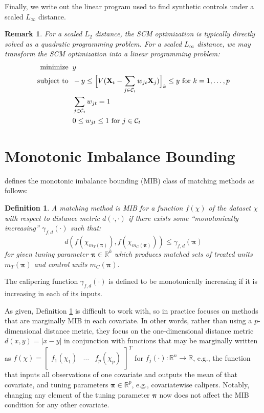 \documentclass{article}
\newtheorem{remark}{Remark}
\newtheorem{definition}{Definition}[section]
\newcommand{\Xt}{\mathbf{X}_t}
\newcommand{\Xj}{\mathbf{X}_j}
\newcommand{\R}{\mathbb{R}}
\newcommand{\Ct}{\mathcal{C}_{t}}
\begin{document}
Finally, we write out the linear program used to find synthetic controls under a scaled $L_\infty$ distance.
\begin{remark}
\label{rem:linf_opt}
For a scaled $L_2$ distance, the SCM optimization is typically directly solved as a quadratic programming problem.
For a scaled $L_\infty$ distance, we may transform the SCM optimization into a linear programming problem:
\begin{align*}
    \text{minimize} &\hspace{2mm} y \\
    \text{subject to} &\hspace{2mm} -y \leq \Big[ V(\Xt - \sum_{j \in \Ct} w_{jt} \Xj) \Big]_k \leq y \text{ for } k = 1, \dots, p \\
    &\hspace{2mm} \sum_{j \in \Ct} w_{jt} = 1 \\
    &\hspace{2mm} 0 \leq w_{jt} \leq 1 \text{ for } j \in \Ct
\end{align*}
\end{remark}


\section{Monotonic Imbalance Bounding}
\label{app:mib}

\citet{iacus2011multivariate} defines the monotonic imbalance bounding (MIB) class of matching methods as follows:
\begin{definition}
\label{def:mib}
    A matching method is MIB for a function $f(\chi)$ of the dataset $\chi$ with respect to distance metric $d(\cdot, \cdot)$ if there exists some ``monotonically increasing'' $\gamma_{f,d}(\cdot)$  such that:
    $$d(f(\chi_{m_T(\boldsymbol{\pi})}), f(\chi_{m_C(\boldsymbol{\pi})})) \leq \gamma_{f,d}(\boldsymbol{\pi})$$
    for given tuning parameter $\boldsymbol{\pi} \in \R^k$ which produces matched sets of treated units $m_T(\boldsymbol{\pi})$ and control units $m_C(\boldsymbol{\pi})$.
\end{definition}
The calipering function $\gamma_{f,d}(\cdot)$ is defined to be monotonically increasing if it is increasing in each of its inputs.

As given, Definition \ref{def:mib} is difficult to work with, so in practice \citet{iacus2011multivariate} focuses on methods that are marginally MIB in each covariate.
In other words, rather than using a $p$-dimensional distance metric, they focus on the one-dimensional distance metric $d(x,y) = |x-y|$ in conjunction with functions that may be marginally written as $f(\chi) = \begin{bmatrix}
    f_1(\chi_1) & \dots & f_p(\chi_p)
\end{bmatrix}^T$ for $f_j(\cdot): \mathbb{R}^n \to \mathbb{R}$, e.g., the function that inputs all observations of one covariate and outputs the mean of that covariate, and tuning parameters $\boldsymbol{\pi} \in \R^p$, e.g., covariatewise calipers.
Notably, changing any element of the tuning parameter $\boldsymbol{\pi}$ now does not affect the MIB condition for any other covariate.
\end{document}
